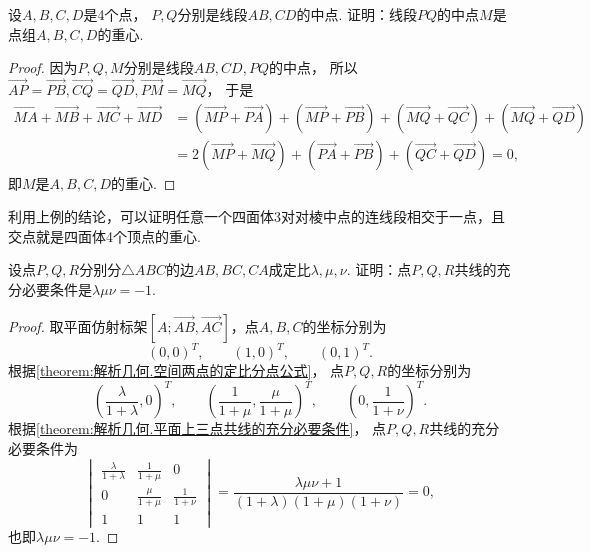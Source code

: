\begin{example}
设\(A,B,C,D\)是4个点，
\(P,Q\)分别是线段\(AB,CD\)的中点.
证明：线段\(PQ\)的中点\(M\)是点组\(A,B,C,D\)的重心.
\begin{proof}
因为\(P,Q,M\)分别是线段\(AB,CD,PQ\)的中点，
所以\(
	\vec{AP} = \vec{PB},
	\vec{CQ} = \vec{QD},
	\vec{PM} = \vec{MQ}
\)，
于是\begin{align*}
	\vec{MA} + \vec{MB} + \vec{MC} + \vec{MD}
	&= (\vec{MP} + \vec{PA}) + (\vec{MP} + \vec{PB})
	+ (\vec{MQ} + \vec{QC}) + (\vec{MQ} + \vec{QD}) \\
	&= 2 (\vec{MP} + \vec{MQ})
	+ (\vec{PA} + \vec{PB})
	+ (\vec{QC} + \vec{QD})
	= 0,
\end{align*}
即\(M\)是\(A,B,C,D\)的重心.
\end{proof}
\end{example}
\begin{remark}
利用上例的结论，可以证明任意一个四面体3对对棱中点的连线段相交于一点，且交点就是四面体4个顶点的重心.
\end{remark}

\begin{example}[门内劳斯定理]
设点\(P,Q,R\)分别分\(\triangle ABC\)的边\(AB,BC,CA\)成定比\(\lambda,\mu,\nu\).
证明：点\(P,Q,R\)共线的充分必要条件是\(\lambda \mu \nu = -1\).
\begin{proof}
取平面仿射标架\([A;\vec{AB},\vec{AC}]\)，点\(A,B,C\)的坐标分别为\begin{equation*}
	(0,0)^T, \qquad
	(1,0)^T, \qquad
	(0,1)^T.
\end{equation*}
根据\cref{theorem:解析几何.空间两点的定比分点公式}，
点\(P,Q,R\)的坐标分别为\begin{equation*}
	\left(\frac{\lambda}{1+\lambda},0\right)^T, \qquad
	\left(\frac{1}{1+\mu},\frac{\mu}{1+\mu}\right)^T, \qquad
	\left(0,\frac{1}{1+\nu}\right)^T.
\end{equation*}
根据\cref{theorem:解析几何.平面上三点共线的充分必要条件}，
点\(P,Q,R\)共线的充分必要条件为\begin{equation*}
	\begin{vmatrix}
		\frac{\lambda}{1+\lambda} & \frac{1}{1+\mu} & 0 \\
		0 & \frac{\mu}{1+\mu} & \frac{1}{1+\nu} \\
		1 & 1 & 1
	\end{vmatrix}
	= \frac{\lambda \mu \nu + 1}{(1+\lambda)(1+\mu)(1+\nu)}
	= 0,
\end{equation*}也即\(\lambda \mu \nu = -1\).
\end{proof}
\end{example}

